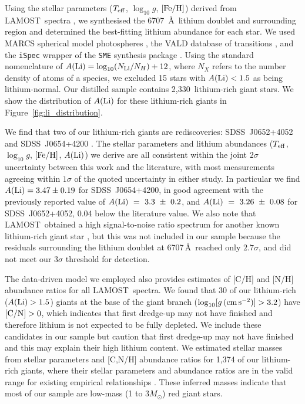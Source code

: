 \documentclass[twocolumn]{aastex62}
\newcommand{\SampleSize}{2,330}
\newcommand\lamost{LAMOST}
\newcommand{\logg}{\log_{10}[g\,({\rm cm\,s}^{-2})]}
\begin{document}

Using the stellar parameters ($T_{\rm eff}$, $\log_{10}{g}$, $[{\rm Fe/H}]$)
derived from \lamost\ spectra \citep{Ho_2017a}, we synthesised the 6707~\AA\ lithium 
doublet and surrounding region and determined the best-fitting lithium abundance for 
each star. We used MARCS spherical model photospheres \citep{Gustafsson_2008}, the
VALD database of transitions \citep{Piskunov_1995}, and the \texttt{iSpec} 
\citep{Blanco_Cuaresma_2014} wrapper of the \texttt{SME} synthesis package \citep{Valenti_1996}.
Using the standard nomenclature of 
$A({\rm Li}) = \log_{10}(N_{\rm Li}/N_{H}) + 12$, where $N_X$ refers to the
number density of atoms of a species, we excluded 15 stars with $A({\rm Li}) < 1.5$
as being lithium-normal. Our distilled sample contains \SampleSize\ 
lithium-rich giant stars. We show the distribution of $A({\rm Li})$ for these 
lithium-rich giants in Figure~\ref{fig:li_distribution}.

We find that two of our lithium-rich giants are rediscoveries:
SDSS~J0652+4052 and SDSS~J0654+4200 \citep{Martell_2013}. The stellar parameters and lithium 
abundances ($T_{\rm eff}$, $\log_{10}g$, $[{\rm Fe/H}]$, $A({\rm Li})$) we 
derive are all consistent within the joint $2\sigma$ uncertainty between this
work and the literature, with most measurements agreeing within $1\sigma$ of 
the quoted uncertainty in either study. In particular we find 
$A({\rm Li}) = 3.47 \pm 0.19$ for SDSS~J0654+4200, in good agreement 
with the previously reported value of $A({\rm Li})~=~3.3~\pm~0.2$,
and $A({\rm Li})~=~3.26~\pm~0.08$ for SDSS~J0652+4052, 0.04 below 
the literature value. We also note that \lamost\ obtained a high signal-to-noise
ratio spectrum for another known lithium-rich giant star \citep[SDSS~J0304+3823;][]{Martell_2013}, 
but this was not included in our sample because the residuals surrounding the
lithium doublet at 6707\,\AA\ reached only $2.7\sigma$, and did not meet our $3\sigma$
threshold for detection.


The data-driven model we employed also provides estimates of [C/H] and [N/H] abundance
ratios for all \lamost\ spectra. We found that 30 of our lithium-rich 
($A({\rm Li}) > 1.5$) giants at the base of the giant branch 
($\logg > 3.2$) have $[{\rm C/N}] > 0$, which indicates that first dredge-up may not have finished and therefore lithium is not expected to be fully depleted.
We include these candidates in our sample but caution that first 
dredge-up may not have finished and this may explain their high
lithium content. We estimated stellar masses from stellar parameters and 
[C,N/H] abundance ratios for 1,374 of our lithium-rich giants, where their 
stellar parameters and abundance ratios are in the valid range for existing 
empirical relationships \citep{Martig_2016}. These inferred masses indicate 
that most of our sample are low-mass (1 to 3$M_\odot$) red giant stars.
\end{document}
